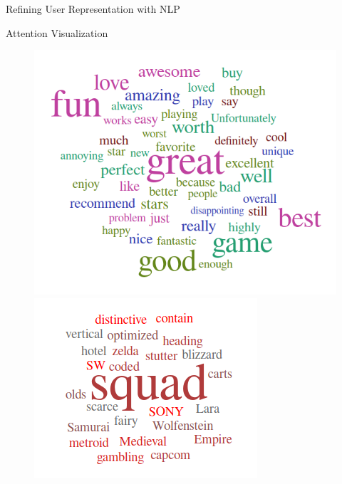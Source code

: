 \begin{section}{Refining User Representation with NLP}
\begin{frame}{Attention Visualization}
    \begin{figure}[t]
    \begin{minipage}[c]{.48\linewidth}
        \includegraphics[width=\linewidth]{img/adj.png}
    \end{minipage} \hfill
    \begin{minipage}[c]{.48\linewidth}
        \includegraphics[width=\linewidth]{img/new_words2.png}
    \end{minipage}
    \label{fig:att_adj_atr}
\end{figure}


\end{frame}
\end{section}
